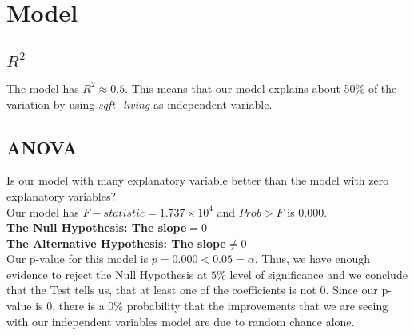 \documentclass[10pt]{article}
\begin{document}
	\nopagebreak
\section*{Model}
\subsection*{\textbf{\(R^2 \)}}
The model has \(R^2\approx 0.5\).  This means that our model explains about 50\% of the variation by using {\it sqft\_living} as independent variable.
\subsection*{ANOVA}
Is our model with many explanatory variable better than the model with zero explanatory variables?\\
Our model has \(F-statistic = 1.737\times 10^4\)  and \(Prob > F\) is \(0.000\).\\
\textbf{The Null Hypothesis:   The slope\(=0\)\\
The Alternative Hypothesis: The slope\(\ne 0\)\\
}
Our p-value for this model is \(p=0.000 < 0.05 = \alpha\). Thus, we have enough evidence to reject the Null Hypothesis at $5\%$ level of significance and we conclude that the Test  tells us, that at least one of the coefficients is not $0$. Since our p-value is $0$, there is a $0\%$ probability that the improvements that we are seeing with our independent variables model are due to random chance alone.\textbf{}
\end{document}
